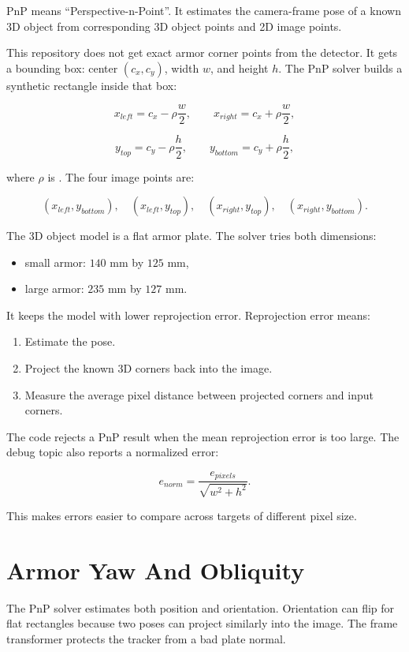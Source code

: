 PnP means ``Perspective-n-Point''. It estimates the camera-frame pose of a
known 3D object from corresponding 3D object points and 2D image points.

This repository does not get exact armor corner points from the detector. It
gets a bounding box: center $(c_x,c_y)$, width $w$, and height $h$. The PnP
solver builds a synthetic rectangle inside that box:

\[
x_{left} = c_x - \rho \frac{w}{2},
\qquad
x_{right} = c_x + \rho \frac{w}{2},
\]

\[
y_{top} = c_y - \rho \frac{h}{2},
\qquad
y_{bottom} = c_y + \rho \frac{h}{2},
\]

where $\rho$ is . The four image points are:

\[
(x_{left}, y_{bottom}),\quad
(x_{left}, y_{top}),\quad
(x_{right}, y_{top}),\quad
(x_{right}, y_{bottom}).
\]

The 3D object model is a flat armor plate. The solver tries both dimensions:

\begin{itemize}
  \item small armor: $140$ mm by $125$ mm,
  \item large armor: $235$ mm by $127$ mm.
\end{itemize}

It keeps the model with lower reprojection error. Reprojection error means:

\begin{enumerate}
  \item Estimate the pose.
  \item Project the known 3D corners back into the image.
  \item Measure the average pixel distance between projected corners and input
  corners.
\end{enumerate}

The code rejects a PnP result when the mean reprojection error is too large.
The debug topic also reports a normalized error:

\[
e_{norm} = \frac{e_{pixels}}{\sqrt{w^2+h^2}}.
\]

This makes errors easier to compare across targets of different pixel size.

\section{Armor Yaw And Obliquity}

The PnP solver estimates both position and orientation. Orientation can flip
for flat rectangles because two poses can project similarly into the image.
The frame transformer protects the tracker from a bad plate normal.

